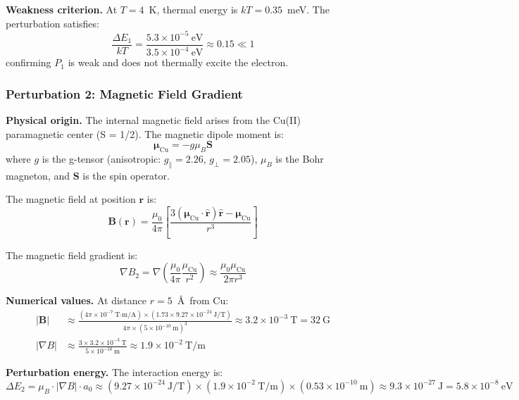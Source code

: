 \documentclass[twocolumn,10pt]{article}
\begin{document}
\textbf{Weakness criterion.} At $T = 4$~K, thermal energy is $kT = 0.35$~meV.
The perturbation satisfies:
%
\[
\frac{\Delta E_1}{kT} = \frac{5.3 \times 10^{-5}~\text{eV}}{3.5 \times 10^{-4}~\text{eV}} \approx 0.15 \ll 1
\]
%
confirming $P_1$ is weak and does not thermally excite the electron.

\subsubsection{Perturbation 2: Magnetic Field Gradient}

\textbf{Physical origin.} The internal magnetic field arises from the Cu(II) 
paramagnetic center (S = 1/2). The magnetic dipole moment is:
%
\begin{equation}
\boldsymbol{\mu}_{\text{Cu}} = -g\mu_B \mathbf{S}
\label{eq:magnetic_moment}
\end{equation}
%
where $g$ is the g-tensor (anisotropic: $g_\parallel = 2.26$, $g_\perp = 2.05$), 
$\mu_B$ is the Bohr magneton, and $\mathbf{S}$ is the spin operator.

The magnetic field at position $\mathbf{r}$ is:
%
\begin{equation}
\mathbf{B}(\mathbf{r}) = \frac{\mu_0}{4\pi} \left[ \frac{3(\boldsymbol{\mu}_{\text{Cu}} \cdot \hat{\mathbf{r}})\hat{\mathbf{r}} - \boldsymbol{\mu}_{\text{Cu}}}{r^3} \right]
\label{eq:magnetic_field}
\end{equation}

The magnetic field gradient is:
%
\begin{equation}
\nabla B_2 = \nabla \left( \frac{\mu_0}{4\pi} \frac{\mu_{\text{Cu}}}{r^2} \right) \approx \frac{\mu_0 \mu_{\text{Cu}}}{2\pi r^3}
\label{eq:magnetic_gradient}
\end{equation}

\textbf{Numerical values.} At distance $r = 5$~\AA\ from Cu:
%
\begin{align}
|\mathbf{B}| &\approx \frac{(4\pi \times 10^{-7}~\text{T·m/A}) \times (1.73 \times 9.27 \times 10^{-24}~\text{J/T})}{4\pi \times (5 \times 10^{-10}~\text{m})^3} \approx 3.2 \times 10^{-3}~\text{T} = 32~\text{G} \\
|\nabla B| &\approx \frac{3 \times 3.2 \times 10^{-3}~\text{T}}{5 \times 10^{-10}~\text{m}} \approx 1.9 \times 10^{-2}~\text{T/m}
\end{align}

\textbf{Perturbation energy.} The interaction energy is:
%
\begin{equation}
\Delta E_2 = \mu_B \cdot |\nabla B| \cdot a_0 \approx (9.27 \times 10^{-24}~\text{J/T}) \times (1.9 \times 10^{-2}~\text{T/m}) \times (0.53 \times 10^{-10}~\text{m}) \approx 9.3 \times 10^{-27}~\text{J} = 5.8 \times 10^{-8}~\text{eV}
\label{eq:magnetic_energy}
\end{equation}
\end{document}
